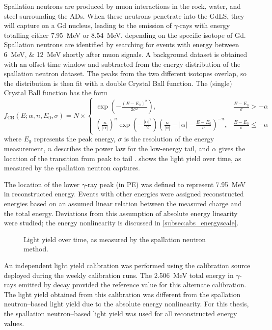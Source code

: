 Spallation neutrons are produced by muon interactions in the rock,
water, and steel surrounding the ADs.
When these neutrons penetrate into the GdLS,
they will capture on a Gd nucleus, leading to the emission of $\gamma$-rays
with energy totalling either \SI{7.95}{\MeV} or \SI{8.54}{\MeV},
depending on the specific isotope of Gd.
Spallation neutrons are identified by searching for events
with energy between \SIlist{6;12}{\MeV} shortly after muon signals.
A background dataset is obtained with an offset time window
and subtracted from the energy distribution of the spallation neutron dataset.
The peaks from the two different isotopes overlap,
so the distribution is then fit with a double Crystal Ball function.
The (single) Crystal Ball function has the form
\begin{equation}\label{eq:crystal_ball}
    f_\text{CB}(E;\alpha, n, E_0, \sigma) = N \times \begin{cases}
        \exp\left(-\frac{(E-E_0)^2}{2\sigma^2}\right),
            & \frac{E-E_0}{\sigma} > -\alpha \\
        \left(\frac{n}{|\alpha|}\right)^n \exp\left(-\frac{|\alpha|^2}{2}\right)
        \left(\frac{n}{|\alpha|} - |\alpha| - \frac{E-E_0}{\sigma}\right)^{-n},
            & \frac{E-E_0}{\sigma} \leq -\alpha
    \end{cases}
\end{equation}
where $E_0$ represents the peak energy,
$\sigma$ is the resolution of the energy measurement,
$n$ describes the power law for the low-energy tail,
and $\alpha$ gives the location of the transition from peak to tail \cite{cbfunction}.
 shows the light yield over time,
as measured by the spallation neutron captures.

The location of the lower $\gamma$-ray peak (in PE)
was defined to represent \SI{7.95}{\MeV} in reconstructed energy.
Events with other energies were assigned reconstructed energies
based on an assumed linear relation between the measured charge
and the total energy.
Deviations from this assumption of absolute energy linearity were studied;
the energy nonlinearity is discussed in \cref{subsec:abs_energyscale}.

\begin{figure}
    \caption{Light yield over time, as measured by the spallation neutron method.}
    \label{fig:lightyield}
\end{figure}

An independent light yield calibration was performed
using the  calibration source
deployed during the weekly calibration runs.
The \SI{2.506}{\MeV} total energy in $\gamma$-rays emitted by  decay
provided the reference value for this alternate calibration.
The light yield obtained from this calibration
was different from the spallation neutron--based light yield
due to the absolute energy nonlinearity.
For this thesis, the spallation neutron--based light yield was used
for all reconstructed energy values.

